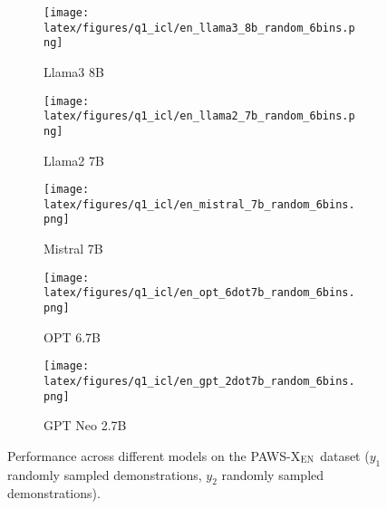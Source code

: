 \begin{figure*}[t!]
    \centering
    \begin{minipage}[t]{\linewidth}
        \begin{subfigure}{0.19\linewidth}
            \centering
            \texttt{[image: latex/figures/q1\_icl/en\_llama3\_8b\_random\_6bins.png]}
            \caption{Llama3 8B}\label{fig:image1}
        \end{subfigure}%
        \hfill
        \begin{subfigure}{0.19\linewidth}
            \centering
            \texttt{[image: latex/figures/q1\_icl/en\_llama2\_7b\_random\_6bins.png]}
            \caption{Llama2 7B}\label{fig:image2}
        \end{subfigure}
        \hfill
        \begin{subfigure}{0.19\linewidth}
            \centering
            \texttt{[image: latex/figures/q1\_icl/en\_mistral\_7b\_random\_6bins.png]}
            \caption{Mistral 7B}\label{fig:image3}
        \end{subfigure}
        \begin{subfigure}{0.19\linewidth}
            \centering
            \texttt{[image: latex/figures/q1\_icl/en\_opt\_6dot7b\_random\_6bins.png]}
            \caption{OPT 6.7B}\label{fig:image4}
        \end{subfigure}%
        \begin{subfigure}{0.19\linewidth}
        \centering
        \texttt{[image: latex/figures/q1\_icl/en\_gpt\_2dot7b\_random\_6bins.png]}
        \caption{GPT Neo 2.7B}\label{fig:image4}
        \end{subfigure}%
    \end{minipage}%
    \hfill
    \begin{minipage}[c]{\linewidth}
        \caption{\label{fig:q1-icl-en}Performance across different models on the PAWS-X$_{\textsc{EN}}$ dataset ($y_1$ randomly sampled demonstrations, $y_2$ randomly sampled demonstrations).}
    \end{minipage}
\end{figure*}